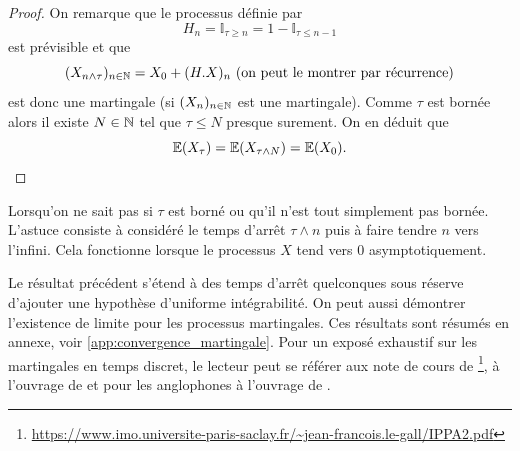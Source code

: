 \begin{proof}
On remarque que le processus définie par
$$
H_{n} = \mathbb{I}_{\tau\geq n} = 1 -\mathbb{I}_{\tau\leq n-1}
$$
est prévisible et que
$$
(X_{n\land \tau})_{n\in\mathbb{N}} = X_0 + (H.X)_n\text{ (on peut le montrer par récurrence)}
$$
est donc une martingale (si $(X_n)_{n\in\mathbb{N}}$ est une martingale). Comme $\tau$ est bornée alors il existe $N\in\mathbb{N}$ tel que $\tau\leq N$ presque surement. On en déduit que
$$
\mathbb{E}(X_{\tau})=\mathbb{E}(X_{\tau\land N})=\mathbb{E}(X_0).
$$
\end{proof}
\begin{remark}
Lorsqu'on ne sait pas si $\tau$ est borné ou qu'il n'est tout simplement pas bornée. L'astuce consiste à considéré le temps d'arrêt $\tau\land n$ puis à faire tendre $n$ vers l'infini. Cela fonctionne lorsque le processus $X$ tend vers $0$ asymptotiquement. 
\end{remark}

Le résultat précédent s'étend à des temps d'arrêt quelconques sous réserve d'ajouter une hypothèse d'uniforme intégrabilité. On peut aussi démontrer l'existence de limite pour les processus martingales. Ces résultats sont résumés en annexe, voir \cref{app:convergence_martingale}. Pour un exposé exhaustif sur les martingales en temps discret, le lecteur peut se référer aux note de cours de \citet[Chapitre 13]{LeGall2006} \footnote{\url{https://www.imo.universite-paris-saclay.fr/~jean-francois.le-gall/IPPA2.pdf}}, à l'ouvrage de \citet[Chapitre 4]{laleuf14} et pour les anglophones à l'ouvrage de \citet{Williams1991}.


